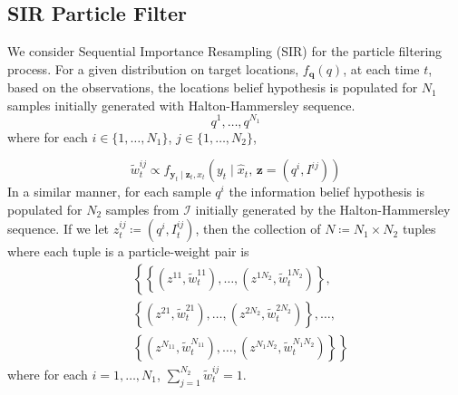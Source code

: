 \documentclass[letterpaper, 10 pt, conference]{ieeeconf}
\begin{document}
\subsection{SIR Particle Filter}
We consider Sequential Importance Resampling (SIR) \cite{arulampalam2002tutorial} for the particle filtering process.
For a given distribution on target locations, $f_{\bm{q}}(q)$, at each time $t$, based on the observations, the locations belief hypothesis is populated for $N_1$ samples initially generated with Halton-Hammersley sequence.
\begin{equation}
 q^{1},\dots,q^{N_1}
\end{equation}
where for each $i \in \lbrace 1,\dots,N_1 \rbrace$, $j \in \lbrace 1,\dots,N_2 \rbrace$,

\begin{equation}
\widetilde{w}_t^{ij} \propto f_{\bm{y}_t \mid \bm{z}_t,x_t}(y_t \mid \hat{x}_t,\, \bm{z}=(q^i,I^{ij}))
\end{equation}
In a similar manner, for each sample $q^{i}$
the information belief hypothesis is populated for $N_2$ samples from $\mathcal{I}$ initially generated by the Halton-Hammersley sequence. If we let $z_t^{ij} \coloneqq (q^{i},I_t^{ij})$, then the collection of $N\coloneqq N_1\times N_2$ tuples where each tuple is a particle-weight pair is
\begin{align*}
&\left\{
\left\{
\left(
z^{11},\widetilde{w}_{t}^{11}\right),\dots,\left(
z^{1N_2},\widetilde{w}_{t}^{1N_2}\right) \right\}\right.,  \\
&\left\{\left(
z^{21},\widetilde{w}_{t}^{21}\right),\dots,\left(
z^{2N_2},\widetilde{w}_{t}^{2N_2}\right) \right\},\dots, \\
&\left. \left\{
\left(
z^{N_11},\widetilde{w}_{t}^{N_11}\right),\dots,\left(
z^{N_1N_2},\widetilde{w}_{t}^{N_1N_2}\right) \right\} \right\}
\end{align*}
where for each $i = 1,\dots,N_1$, $\sum_{j=1}^{N_2} \widetilde{w}_{t}^{ij} = 1$.
\end{document}
